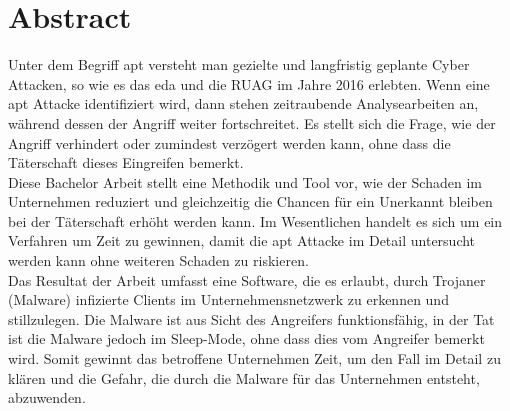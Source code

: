 \chapter{Abstract}

Unter dem Begriff \gls{apt} versteht man gezielte und langfristig geplante Cyber Attacken, so wie es das \gls{eda} und die RUAG im Jahre 2016 erlebten. Wenn eine \gls{apt} Attacke identifiziert wird, dann stehen zeitraubende Analysearbeiten an, während dessen der Angriff weiter fortschreitet. Es stellt sich die Frage, wie der Angriff verhindert oder zumindest verzögert werden kann, ohne dass die Täterschaft dieses Eingreifen bemerkt.\\

Diese Bachelor Arbeit stellt eine Methodik und Tool vor, wie der Schaden im Unternehmen reduziert und gleichzeitig die Chancen für ein Unerkannt bleiben bei der Täterschaft erhöht werden kann. Im Wesentlichen handelt es sich um ein Verfahren um Zeit zu gewinnen, damit die \gls{apt} Attacke im Detail untersucht werden kann ohne weiteren Schaden zu riskieren.\\

Das Resultat der Arbeit umfasst eine Software, die es erlaubt, durch Trojaner (Malware) infizierte Clients im Unternehmensnetzwerk zu erkennen und stillzulegen. Die Malware ist aus Sicht des Angreifers funktionsfähig, in der Tat ist die Malware jedoch im Sleep-Mode, ohne dass dies vom Angreifer bemerkt wird. Somit gewinnt das betroffene Unternehmen Zeit, um den Fall im Detail zu klären und die Gefahr, die durch die Malware für das Unternehmen entsteht, abzuwenden.
